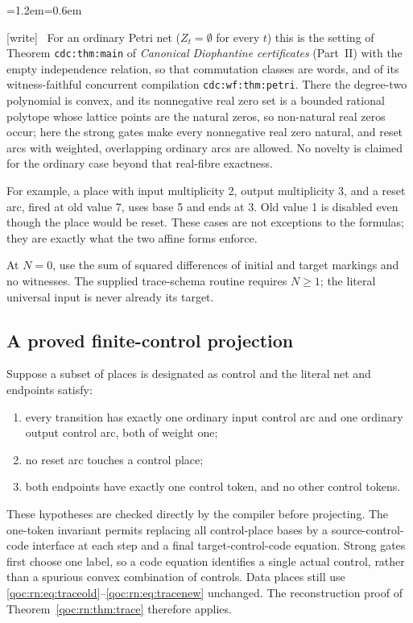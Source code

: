 \documentclass[11pt,letterpaper]{article}
\theoremstyle{definition}
\theoremstyle{remark}
\newcommand{\wtag}{\textup{[write]}}
\newenvironment{writenote}{\par\smallskip\begin{list}{}{\leftmargin=1.2em\rightmargin=0.6em}\item[]\small\wtag\ }{\end{list}\smallskip}
\newcommand{\lab}[1]{\nolinkurl{#1}}
\begin{document}
\begin{writenote}
For an ordinary Petri net ($Z_t=\emptyset$ for every $t$) this is the setting of Theorem \lab{cdc:thm:main} of \emph{Canonical Diophantine certificates} (Part~II) with the empty independence relation, so that commutation classes are words, and of its witness-faithful concurrent compilation \lab{cdc:wf:thm:petri}. There the degree-two polynomial is convex, and its nonnegative real zero set is a bounded rational polytope whose lattice points are the natural zeros, so non-natural real zeros occur; here the strong gates make every nonnegative real zero natural, and reset arcs with weighted, overlapping ordinary arcs are allowed. No novelty is claimed for the ordinary case beyond that real-fibre exactness.
\end{writenote}

For example, a place with input multiplicity 2, output multiplicity 3, and a reset arc, fired at old value 7, uses base 5 and ends at 3. Old value 1 is disabled even though the place would be reset. These cases are not exceptions to the formulas; they are exactly what the two affine forms enforce.

At $N=0$, use the sum of squared differences of initial and target markings and no witnesses. The supplied trace-schema routine requires $N\geq1$; the literal universal input is never already its target.

\subsection{A proved finite-control projection}
Suppose a subset of places is designated as control and the literal net and endpoints satisfy:
\begin{enumerate}
\item every transition has exactly one ordinary input control arc and one ordinary output control arc, both of weight one;
\item no reset arc touches a control place;
\item both endpoints have exactly one control token, and no other control tokens.
\end{enumerate}
These hypotheses are checked directly by the compiler before projecting. The one-token invariant permits replacing all control-place bases by a source-control-code interface at each step and a final target-control-code equation. Strong gates first choose one label, so a code equation identifies a single actual control, rather than a spurious convex combination of controls. Data places still use \eqref{qoc:rn:eq:traceold}--\eqref{qoc:rn:eq:tracenew} unchanged. The reconstruction proof of Theorem~\ref{qoc:rn:thm:trace} therefore applies.
\end{document}
